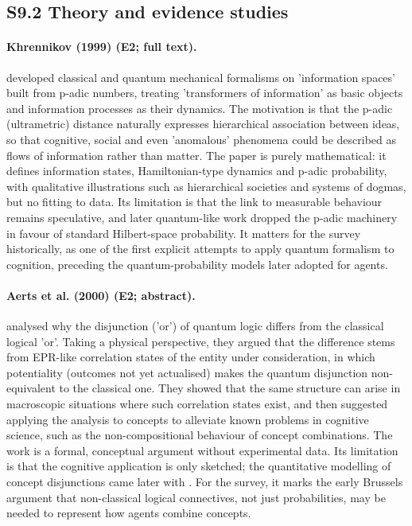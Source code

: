 \documentclass[10pt,a4paper]{article}
\begin{document}
\subsection*{S9.2 Theory and evidence studies}
\paragraph{Khrennikov (1999) (E2; full text).} \citet{Khrennikov1999} developed classical and quantum mechanical formalisms on 'information spaces' built from p-adic numbers, treating 'transformers of information' as basic objects and information processes as their dynamics. The motivation is that the p-adic (ultrametric) distance naturally expresses hierarchical association between ideas, so that cognitive, social and even 'anomalous' phenomena could be described as flows of information rather than matter. The paper is purely mathematical: it defines information states, Hamiltonian-type dynamics and p-adic probability, with qualitative illustrations such as hierarchical societies and systems of dogmas, but no fitting to data. Its limitation is that the link to measurable behaviour remains speculative, and later quantum-like work dropped the p-adic machinery in favour of standard Hilbert-space probability. It matters for the survey historically, as one of the first explicit attempts to apply quantum formalism to cognition, preceding the quantum-probability models later adopted for agents.

\paragraph{Aerts et al. (2000) (E2; abstract).} \citet{Aerts2000} analysed why the disjunction ('or') of quantum logic differs from the classical logical 'or'. Taking a physical perspective, they argued that the difference stems from EPR-like correlation states of the entity under consideration, in which potentiality (outcomes not yet actualised) makes the quantum disjunction non-equivalent to the classical one. They showed that the same structure can arise in macroscopic situations where such correlation states exist, and then suggested applying the analysis to concepts to alleviate known problems in cognitive science, such as the non-compositional behaviour of concept combinations. The work is a formal, conceptual argument without experimental data. Its limitation is that the cognitive application is only sketched; the quantitative modelling of concept disjunctions came later with \citep{Aerts2009}. For the survey, it marks the early Brussels argument that non-classical logical connectives, not just probabilities, may be needed to represent how agents combine concepts.
\end{document}
